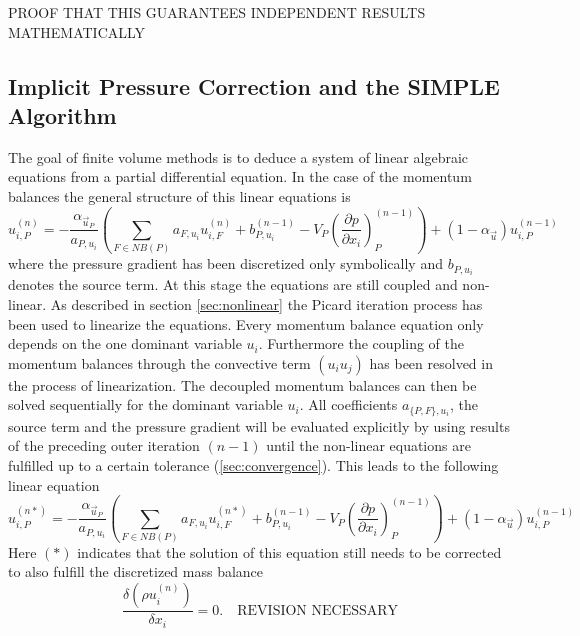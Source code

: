   PROOF THAT THIS GUARANTEES INDEPENDENT RESULTS MATHEMATICALLY

  \subsection{Implicit Pressure Correction and the SIMPLE Algorithm}
  \label{sec:simple}
  
  The goal of finite volume methods is to deduce a system of linear algebraic equations from a partial differential equation. In the case of the momentum balances the general structure of this linear equations is
  \begin{equation}
    \label{eq:linfinal}
    u_{i,P}^{(n)} 
    = 
    - \frac{\alpha_{\vec{u}_P}}{a_{P,u_i}} \left(\sum_{F \in NB(P)} a_{F,u_i} u_{i,F}^{(n)}
    +                                     b_{P,u_i}^{(n-1)} 
    -                                     V_P\left(\frac{\partial p}{\partial x_i}\right)_P^{(n-1)} \right)
    + \left(1 - \alpha_{\vec{u}}\right) u_{i,P}^{(n-1)}  
  \end{equation}
  where the pressure gradient has been discretized only symbolically and \(b_{P,u_i}\) denotes the source term. At this stage the equations are still coupled and non-linear. As described in section \ref{sec:nonlinear} the Picard iteration process has been used to linearize the equations. Every momentum balance equation only depends on the one dominant variable \(u_i\). Furthermore the coupling of the momentum balances through the convective term \((u_i u_j)\) has been resolved in the process of linearization. The decoupled momentum balances can then be solved sequentially for the dominant variable \(u_i\). All coefficients \(a_{\{P,F\},u_i}\), the source term and the pressure gradient will be evaluated explicitly by using results of the preceding outer iteration \((n-1)\) until the non-linear equations are fulfilled up to a certain tolerance (\ref{sec:convergence}). This leads to the following linear equation 
  \begin{equation}
    \label{eq:nodeinter}
    u_{i,P}^{(n*)} 
    = 
    - \frac{\alpha_{\vec{u}_P}}{a_{P,u_i}} \left(\sum_{F \in NB(P)} a_{F,u_i} u_{i,F}^{(n*)}
    +                                     b_{P,u_i}^{(n-1)} 
    -                                     V_P\left(\frac{\partial p}{\partial x_i}\right)_P^{(n-1)} \right)
    + \left(1 - \alpha_{\vec{u}}\right) u_{i,P}^{(n-1)}  
\end{equation}
Here \((*)\) indicates that the solution of this equation still needs to be corrected to also fulfill the discretized mass balance
  \begin{equation}
    \label{eq:contisemi}
    \frac{\delta \left(\rho u_i^{(n)}\right)}{\delta x_i} = 0. \quad\text{REVISION NECESSARY}
  \end{equation}

